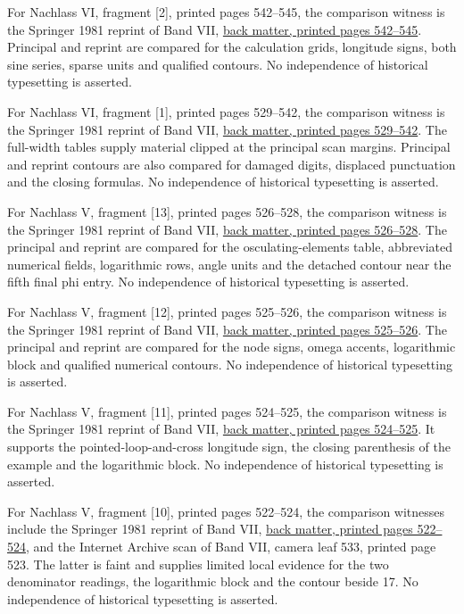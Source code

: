 For Nachlass VI, fragment [2], printed pages 542–545, the comparison witness is the Springer 1981 reprint of Band VII, \href{https://link.springer.com/content/pdf/bbm:978-3-642-92478-1/1}{back matter, printed pages 542–545}. Principal and reprint are compared for the calculation grids, longitude signs, both sine series, sparse units and qualified contours. No independence of historical typesetting is asserted.



For Nachlass VI, fragment [1], printed pages 529–542, the comparison witness is the Springer 1981 reprint of Band VII, \href{https://link.springer.com/content/pdf/bbm:978-3-642-92478-1/1}{back matter, printed pages 529–542}. The full-width tables supply material clipped at the principal scan margins. Principal and reprint contours are also compared for damaged digits, displaced punctuation and the closing formulas. No independence of historical typesetting is asserted.



For Nachlass V, fragment [13], printed pages 526–528, the comparison witness is the Springer 1981 reprint of Band VII, \href{https://link.springer.com/content/pdf/bbm:978-3-642-92478-1/1}{back matter, printed pages 526–528}. The principal and reprint are compared for the osculating-elements table, abbreviated numerical fields, logarithmic rows, angle units and the detached contour near the fifth final phi entry. No independence of historical typesetting is asserted.



For Nachlass V, fragment [12], printed pages 525–526, the comparison witness is the Springer 1981 reprint of Band VII, \href{https://link.springer.com/content/pdf/bbm:978-3-642-92478-1/1}{back matter, printed pages 525–526}. The principal and reprint are compared for the node signs, omega accents, logarithmic block and qualified numerical contours. No independence of historical typesetting is asserted.



For Nachlass V, fragment [11], printed pages 524–525, the comparison witness is the Springer 1981 reprint of Band VII, \href{https://link.springer.com/content/pdf/bbm:978-3-642-92478-1/1}{back matter, printed pages 524–525}. It supports the pointed-loop-and-cross longitude sign, the closing parenthesis of the example and the logarithmic block. No independence of historical typesetting is asserted.



For Nachlass V, fragment [10], printed pages 522–524, the comparison witnesses include the Springer 1981 reprint of Band VII, \href{https://link.springer.com/content/pdf/bbm:978-3-642-92478-1/1}{back matter, printed pages 522–524}, and the Internet Archive scan of Band VII, camera leaf 533, printed page 523. The latter is faint and supplies limited local evidence for the two denominator readings, the logarithmic block and the contour beside 17. No independence of historical typesetting is asserted.




